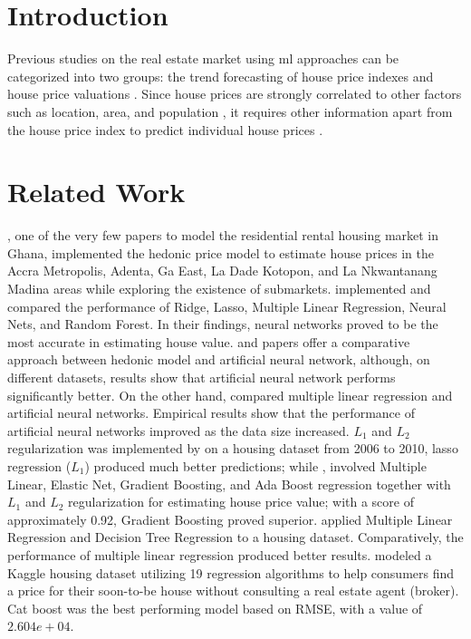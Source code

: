 
\begin{sloppypar}
	
	\section{Introduction}
	Previous studies on the real estate market using \ac{ml} approaches can be categorized into two groups: the trend forecasting of house price indexes and house price valuations \citep{Phan2019}. Since house prices are strongly correlated to other factors such as location, area, and population \citep{Kamal2021b}, it requires other information apart from the house price index to predict individual house prices \citep{Truong2020}.
	
	
	\section{Related Work}
	\citep{Gavu2019a}, one of the very few papers to model the residential rental housing market in Ghana, implemented the hedonic price model to estimate house prices in the Accra Metropolis, Adenta, Ga East, La Dade Kotopon, and La Nkwantanang Madina areas while exploring the existence of submarkets. \newline
	\citep{panhouse} implemented and compared the performance of Ridge, Lasso, Multiple Linear Regression, Neural Nets, and Random Forest. In their findings, neural networks proved to be the most accurate in estimating house value. \newline
	\citep{Selim2009} and \citep{Limsombunchai2004a} papers offer a comparative approach between hedonic model and artificial neural network, although, on different datasets, results show that artificial neural network performs significantly better. On the other hand, \citep{Nguyen2001} compared multiple linear regression and artificial neural networks. Empirical results show that the performance of artificial neural networks improved as the data size increased. \newline
	$ L_1 $ and $ L_2 $ regularization was implemented by \citep{Xin2018} on a housing dataset from 2006 to 2010, lasso regression ($ L_1 $) produced much better predictions; while \citep{Madhuri2019}, involved Multiple Linear, Elastic Net, Gradient Boosting, and Ada Boost regression together with $ L_1 $ and $ L_2 $ regularization for estimating house price value; with a score of approximately 0.92, Gradient Boosting proved superior. \newline
	\citep{Thamarai2020a} applied Multiple Linear Regression and Decision Tree Regression to a housing dataset. Comparatively, the performance of multiple linear regression produced better results. \newline 
	\citep{Vineeth2018} modeled a Kaggle housing dataset utilizing 19 regression algorithms to help consumers find a price for their soon-to-be house without consulting a real estate agent (broker). Cat boost was the best performing model based on RMSE, with a value of $2.604e+04 $.

\end{sloppypar}